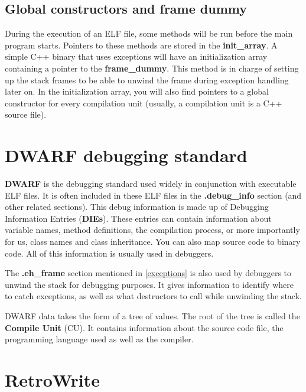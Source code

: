 \documentclass[a4paper,11pt,oneside]{report}
\begin{document}
\subsection{Global constructors and frame dummy}
\label{framedummy}

During the execution of an ELF file, some methods will be run before the main
program starts. Pointers to these methods are stored in the
\textbf{init\_array}.
A simple C++ binary that uses exceptions will have an initialization array
containing a pointer to the \textbf{frame\_dummy}. This method is in charge of
setting up the stack frames to be able to unwind the frame during exception
handling later on.
In the initialization array, you will also find pointers to a global
constructor for every compilation unit (usually, a compilation unit is a C++
source file).

\section{DWARF debugging standard}
\label{dwarf}

\textbf{DWARF} is the debugging standard used widely in conjunction with 
executable ELF files.
It is often included in these ELF files in the \textbf{.debug\_info} section 
(and other related sections).
This debug information is made up of Debugging Information Entries 
(\textbf{DIEs}).
These entries can contain information about variable names, method definitions, 
the compilation process, or more importantly for us, class names and class 
inheritance. You can also map source code to binary code.
All of this information is usually used in debuggers.

The \textbf{.eh\_frame} section mentioned in \autoref{exceptions} is also used
by debuggers to unwind the stack for debugging purposes.
It gives information to identify where to catch exceptions, as well as what
destructors to call while unwinding the stack.

DWARF data takes the form of a tree of values.
The root of the tree is called the \textbf{Compile Unit} (CU).
It contains information about the source code file, the programming language
used as well as the compiler.

\section{RetroWrite} \label{retrowritesection}

\end{document}
